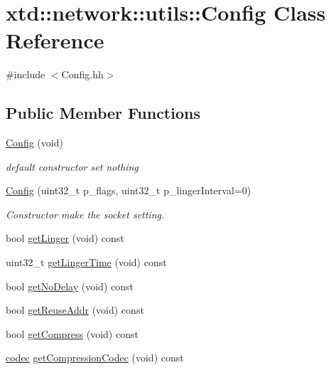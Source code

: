 \hypertarget{classxtd_1_1network_1_1utils_1_1Config}{\section{xtd\-:\-:network\-:\-:utils\-:\-:Config Class Reference}
\label{classxtd_1_1network_1_1utils_1_1Config}
}


{\ttfamily \#include $<$Config.\-hh$>$}

\subsection*{Public Member Functions}
\begin{DoxyCompactItemize}
\item 
\hyperlink{classxtd_1_1network_1_1utils_1_1Config_a38494ac8cb1f19047196843e3b911f8a}{Config} (void)
\begin{DoxyCompactList}\small\item\em default constructor set nothing \end{DoxyCompactList}\item 
\hyperlink{classxtd_1_1network_1_1utils_1_1Config_abbf53027f45806e78cec4f50e4ea7def}{Config} (uint32\-\_\-t p\-\_\-flags, uint32\-\_\-t p\-\_\-linger\-Interval=0)
\begin{DoxyCompactList}\small\item\em Constructor make the socket setting. \end{DoxyCompactList}\item 
bool \hyperlink{classxtd_1_1network_1_1utils_1_1Config_ab43d43856cea3b9bf159b38d2d13d82b}{get\-Linger} (void) const 
\item 
uint32\-\_\-t \hyperlink{classxtd_1_1network_1_1utils_1_1Config_aacb13cdd90746d5684feb00d7cdbefcc}{get\-Linger\-Time} (void) const 
\item 
bool \hyperlink{classxtd_1_1network_1_1utils_1_1Config_a499712a4fd63e48be43ff24eb94e72ff}{get\-No\-Delay} (void) const 
\item 
bool \hyperlink{classxtd_1_1network_1_1utils_1_1Config_a3914a56737d69dd8879e03ed9b3dc855}{get\-Reuse\-Addr} (void) const 
\item 
bool \hyperlink{classxtd_1_1network_1_1utils_1_1Config_a89faeb4f4a949ae6fe18b907814987ee}{get\-Compress} (void) const 
\item 
\hyperlink{namespacextd_1_1network_1_1utils_a3ac1216ad2037b366cc1f9051a978161}{codec} \hyperlink{classxtd_1_1network_1_1utils_1_1Config_a82a7b809f4d41f4124badef452b9698d}{get\-Compression\-Codec} (void) const 

\end{DoxyCompactItemize}
